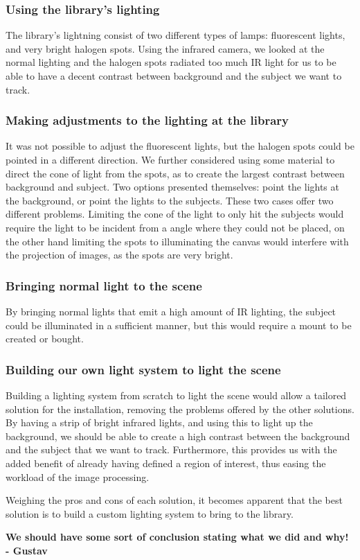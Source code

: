 \subsubsection{Using the library's lighting}
The library's lightning consist of two different types of lamps: fluorescent lights, and very bright halogen spots. Using the infrared camera, we looked at the normal lighting and the halogen spots radiated too much IR light for us to be able to have a decent contrast between background and the subject we want to track.

\subsubsection{Making adjustments to the lighting at the library}
It was not possible to adjust the fluorescent lights, but the halogen spots could be pointed in a different direction. We further considered using some material to direct the cone of light from the spots, as to create the largest contrast between background and subject. Two options presented themselves: point the lights at the background, or point the lights to the subjects. These two cases offer two different problems. Limiting the cone of the light to only hit the subjects would require the light to be incident from a angle where they could not be placed, on the other hand limiting the spots to illuminating the canvas would interfere with the projection of images, as the spots are very bright.

\subsubsection{Bringing normal light to the scene} 
By bringing normal lights that emit a high amount of IR lighting, the subject could be illuminated in a sufficient manner, but this would require a mount to be created or bought.

\subsubsection{Building our own light system to light the scene}
Building a lighting system from scratch to light the scene would allow a tailored solution for the installation, removing the problems offered by the other solutions. By having a strip of bright infrared lights, and using this to light up the background, we should be able to create a high contrast between the background and the subject that we want to track. Furthermore, this provides us with the added benefit of already having defined a region of interest, thus easing the workload of the image processing. 

Weighing the pros and cons of each solution, it becomes apparent that the best solution is to build a custom lighting system to bring to the library.

\textbf{We should have some sort of conclusion stating what we did and why! - Gustav}
